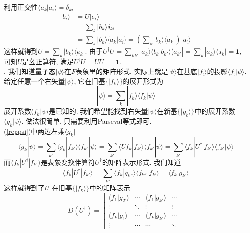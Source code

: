 \documentclass[a4paper,11pt]{book}
\begin{document}
利用正交性$\langle a_k|a_i\rangle=\delta_{ki}$
\begin{equation*}
\begin{split}
       |b_i\rangle & =U|a_i\rangle \\
         & =\sum_{k}|b_k\rangle\delta_{ki} \\
         & =\sum_{k}|b_k\rangle\langle a_k|a_i\rangle=(\sum_{k}|b_k\rangle\langle a_k|)|a_i\rangle
\end{split}
\end{equation*}
这样就得到$U=\sum_{k}|b_k\rangle\langle a_k|$. 由于$U^\dag U=\sum_{kk'}|a_k\rangle\langle b_k|b_{k'}\rangle\langle a_{k'}|=\sum_{k}|a_k\rangle\langle a_k|=\mathbf{1}$, 可知$U$是幺正算符, 满足$U^\dag U=UU^\dag=\mathbf{1}$. \\
, 我们知道量子态$|\psi\rangle$在$F$表象里的矩阵形式, 实际上就是$|\psi\rangle$在基底$|f_i\rangle$的投影$\langle f_i|\psi\rangle$. 给定任意一个右矢量$|\psi\rangle$, 它在旧基$\{|f_k\rangle\}$的展开形式为
\begin{equation}\label{reppsi}
  |\psi\rangle=\sum_{k}|f_k\rangle\langle f_k|\psi\rangle
\end{equation}
展开系数$\langle f_k|\psi\rangle$是已知的. 我们希望能找到右矢量$|\psi\rangle$在新基$\{|g_k\rangle\}$中的展开系数$\langle g_k|\psi\rangle$. 做法很简单, 只需要利用Parseval等式即可.\\
(\eqref{reppsi})中两边左乘$\langle g_k|$
\begin{equation*}
  \langle g_k|\psi\rangle=\sum_{k'}\langle g_k|f_{k'}\rangle\langle f_{k'}|\psi\rangle=\sum_{k'}\langle Uf_k|f_{k'}\rangle\langle f_{k'}|\psi\rangle=\sum_{k'}\langle f_k|U^\dag|f_{k'}\rangle\langle f_{k'}|\psi\rangle
\end{equation*}
而$\langle f_k|U^\dag|f_{k'}\rangle$是表象变换伴算符$U^\dag$的矩阵表示形式. 我们知道
\begin{equation*}
  \langle f_k|U^\dag|f_{k'}\rangle=\sum_{k''}\langle f_k|g_{k''}\rangle\langle f_{k''}|f_{k'}\rangle=\langle f_k|g_{k'}\rangle
\end{equation*}
这样就得到了$U^\dag$在旧基$\{|f_k\rangle\}$中的矩阵表示
\begin{equation*}
  D(U^\dag)=\begin{bmatrix}
              \langle f_1|g_{2'}\rangle & \cdots & \langle f_1|g_{k'}\rangle & \cdots \\
              \vdots & \ddots & \vdots & \vdots \\
              \langle f_k|g_{1}\rangle & \cdots & \langle f_k|g_{k'}\rangle & \cdots \\
              \vdots & \cdots & \cdots & \ddots
            \end{bmatrix}
\end{equation*}
\end{document}
